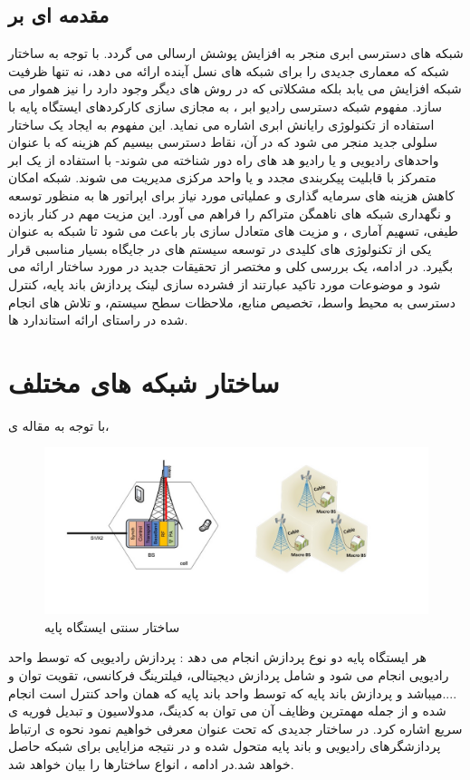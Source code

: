 \subsection{مقدمه ای بر }
شبکه های دسترسی ابری منجر به افزایش پوشش ارسالی می گردد. با توجه به ساختار شبکه
    که معماری جدیدی را برای شبکه های نسل آینده
ارائه می دهد، نه تنها ظرفیت شبکه افزایش می یابد بلکه
مشکلاتی که در روش های دیگر وجود دارد را نیز هموار
می سازد.
مفهوم شبکه دسترسی رادیو ابر ، به مجازی سازی کارکردهای ایستگاه  پایه  با استفاده از تکنولوژی رایانش ابری  اشاره می نماید. این مفهوم به ایجاد یک ساختار سلولی جدید منجر می شود که در آن، نقاط دسترسی بیسیم کم هزینه که با عنوان واحدهای رادیویی  و یا رادیو هد های
  راه دور 
 شناخته می شوند- با استفاده از یک ابر متمرکز با قابلیت پیکربندی مجدد و یا واحد مرکزی  مدیریت می شوند. شبکه امکان کاهش هزینه های سرمایه گذاری و عملیاتی مورد نیاز برای اپراتور ها به منظور توسعه و نگهداری شبکه های ناهمگن متراکم را فراهم می آورد. این مزیت مهم در کنار بازده طیفی، تسهیم آماری ، و مزیت های متعادل سازی بار باعث می شود تا شبکه  به عنوان یکی از تکنولوژی های کلیدی در توسعه سیستم های  در جایگاه بسیار مناسبی قرار بگیرد. در ادامه، یک بررسی کلی و مختصر از تحقیقات جدید در مورد ساختار  ارائه می شود و موضوعات مورد تاکید عبارتند از فشرده سازی لینک  پردازش باند پایه، کنترل دسترسی به محیط واسط، تخصیص منابع، ملاحظات سطح سیستم، و تلاش های انجام شده در راستای ارائه استاندارد ها.
\section{ساختار شبکه های مختلف }
با توجه به مقاله ی\cite{checko2015cloud}،
\begin{figure}
  \centering
    \includegraphics[scale=0.7]{c11}
  \caption{ساختار سنتی ایستگاه پایه \cite{checko2015cloud}}
  \label{fig:c11}
\end{figure}
هر ایستگاه پایه دو نوع پردازش انجام می دهد : پردازش
رادیویی که توسط واحد رادیویی  انجام می شود و شامل پردازش
دیجیتالی، فیلترینگ فرکانسی، تقویت توان و ....میباشد و
پردازش باند پایه که توسط واحد باند پایه  که همان واحد کنترل است  انجام شده و از جمله
مهمترین وظایف آن می توان به کدینگ، مدولاسیون و
تبدیل فوریه ی سریع اشاره کرد. در ساختار جدیدی که
تحت عنوان   معرفی خواهیم نمود نحوه ی ارتباط
پردازشگرهای رادیویی و باند پایه متحول شده و در نتیجه
مزایایی برای شبکه حاصل خواهد شد.در ادامه ، انواع ساختارها را بیان خواهد شد.

